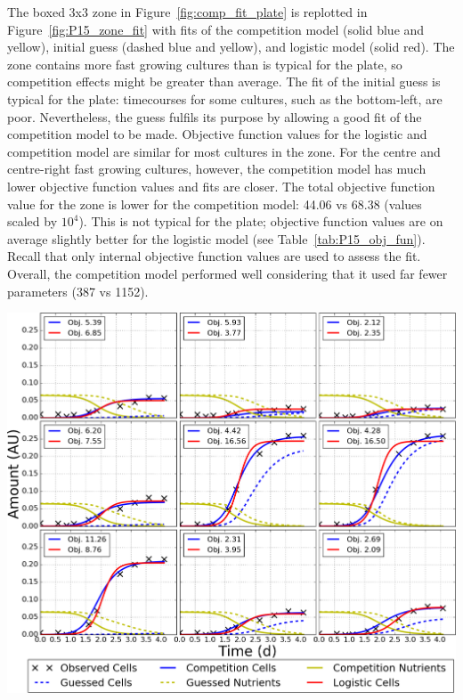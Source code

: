 The boxed 3x3 zone in Figure~\ref{fig:comp_fit_plate} is replotted in
Figure~\ref{fig:P15_zone_fit} with fits of the competition model
(solid blue and yellow), initial guess (dashed blue and yellow), and
logistic model (solid red). The zone contains more fast growing
cultures than is typical for the plate, so competition effects might
be greater than average.
The fit of the initial guess is typical for the plate: timecourses for
some cultures, such as the bottom-left, are poor. Nevertheless, the
guess fulfils its purpose by allowing a good fit of the competition
model to be made. Objective function values for the logistic and
competition model are similar for most cultures in the zone. For the
centre and centre-right fast growing cultures, however, the
competition model has much lower objective function values and fits
are closer. The total objective function value for the zone is lower
for the competition model: 44.06 vs 68.38 (values scaled by
\(10^{4}\)). This is not typical for the plate; objective function
values are on average slightly better for the logistic model (see
Table~\ref{tab:P15_obj_fun}). Recall that only internal objective
function values are used to assess the fit. Overall, the competition
model performed well considering that it used far fewer parameters
(387 vs 1152).

\graphicspath{{images/p15_fits/}}
\begin{Figure}
  \centering
  \includegraphics[width=\linewidth]{final/zone_r5_c18_with_obj_fun_2}
  \label{fig:P15_zone_fit}
\end{Figure}

